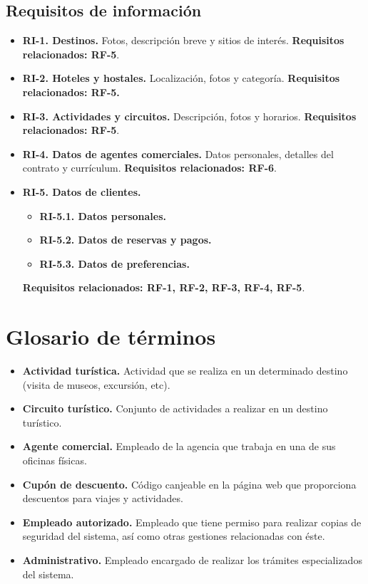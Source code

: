 \documentclass{article}
\begin{document}
	\subsection{Requisitos de información}
	\begin{itemize}
		\item \textbf{RI-1. Destinos.} Fotos, descripción breve y sitios de interés. \textbf{Requisitos relacionados: RF-5}.
		\item \textbf{RI-2. Hoteles y hostales.} Localización, fotos y categoría. \textbf{Requisitos relacionados: RF-5.}
		\item \textbf{RI-3. Actividades y circuitos.} Descripción, fotos y horarios. \textbf{Requisitos relacionados: RF-5}.
		\item \textbf{RI-4. Datos de agentes comerciales.} Datos personales, detalles del contrato y currículum. \textbf{Requisitos relacionados: RF-6}.
		\item \textbf{RI-5. Datos de clientes.}
		\begin{itemize}
			\item \textbf{RI-5.1. Datos personales.}
			\item \textbf{RI-5.2. Datos de reservas y pagos.}
			\item \textbf{RI-5.3. Datos de preferencias.}
		\end{itemize}
		\textbf{Requisitos relacionados: RF-1, RF-2, RF-3, RF-4, RF-5}.
	\end{itemize}
	\section{Glosario de términos}
	\begin{itemize}
		\item \textbf{Actividad turística.} Actividad que se realiza en un determinado destino (visita de museos, excursión, etc).
		\item \textbf{Circuito turístico.} Conjunto de actividades a realizar en un destino turístico.
		\item \textbf{Agente comercial.} Empleado de la agencia que trabaja en una de sus oficinas físicas.
		\item \textbf{Cupón de descuento.} Código canjeable en la página web que proporciona descuentos para viajes y actividades.
		\item \textbf{Empleado autorizado.} Empleado que tiene permiso para realizar copias de seguridad del sistema, así como otras gestiones relacionadas con éste.
		\item \textbf{Administrativo.} Empleado encargado de realizar los trámites especializados del sistema.
	\end{itemize}
\end{document}
